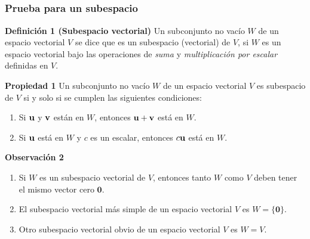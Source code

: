 
\subsection{}

{\nologo
\begin{frame}\frametitle{Prueba para un subespacio}

\vspace{-2mm}

\begin{block}{\textbf{Definición 1 (Subespacio vectorial)}}	
	\justifying
	Un subconjunto no vacío $W$ de un espacio vectorial $V$ se dice que es un {\color{red} subespacio (vectorial)} 
	de $V$, si $W$ es un espacio vectorial bajo las operaciones de \textit{suma} y \textit{multiplicación por escalar} definidas en $V$.
\end{block}

\begin{prop}{\textbf{Propiedad 1}}
	\justifying
	Un subconjunto no vacío $W$ de un espacio vectorial $V$ es {\color{red} subespacio} 
	de $V$ si y solo si se cumplen las siguientes condiciones:
	\begin{enumerate}
		\item[\labelname{$a$}] Si $\mathbf{u}$ y $\mathbf{v}$ están en $W$, entonces $\mathbf{u}+\mathbf{v}$ está en $W$.
		\item[\labelname{$b$}] Si $\mathbf{u}$ está en $W$ y $c$ es un escalar, entonces $c\mathbf{u}$ está en $W$.
	\end{enumerate}
\end{prop}

\begin{alertblock}{\textbf{Observación 2}}
	\begin{enumerate}\justifying
		\item[\labelname{$a$}] Si $W$ es un subespacio vectorial de $V$, entonces tanto $W$ como $V$ deben 
		tener el mismo vector cero $\mathbf{0}$.
		\item[\labelname{$b$}] El subespacio vectorial  más simple de un espacio vectorial $V$ es $W=\{\mathbf{0}\}$.
		\item[\labelname{$c$}] Otro subespacio vectorial obvio de un espacio vectorial $V$ es $W=V$.
	\end{enumerate}
\end{alertblock}

\end{frame}
}

